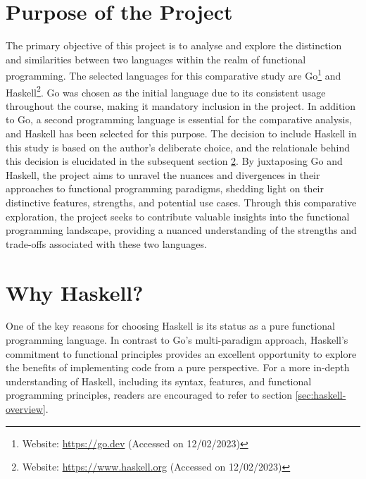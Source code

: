     \section{Purpose of the Project}\label{sec:purpose}
    The primary objective of this project is to analyse and explore the distinction and similarities between two languages within the realm of functional programming. The selected languages for this comparative study are Go\footnote{Website: \url{https://go.dev} (Accessed on 12/02/2023)} and Haskell\footnote{Website: \url{https://www.haskell.org} (Accessed on 12/02/2023)}. Go was chosen as the initial language due to its consistent usage throughout the course, making it mandatory inclusion in the project. 
    In addition to Go, a second programming language is essential for the comparative analysis, and Haskell has been selected for this purpose. The decision to include Haskell in this study is based on the author's deliberate choice, and the relationale behind this decision is elucidated in the subsequent section \ref{sec:whyhaskell}. By juxtaposing Go and Haskell, the project aims to unravel the nuances and divergences in their approaches to functional programming paradigms, shedding light on their distinctive features, strengths, and potential use cases. Through this comparative exploration, the project seeks to contribute valuable insights into the functional programming landscape, providing a nuanced understanding of the strengths and trade-offs associated with these two languages.

    \section{Why Haskell?}\label{sec:whyhaskell}
    One of the key reasons for choosing Haskell is its status as a pure functional programming language. In contrast to Go's multi-paradigm approach, Haskell's commitment to functional principles provides an excellent opportunity to explore the benefits of implementing code from a pure perspective.
    For a more in-depth understanding of Haskell, including its syntax, features, and functional programming principles, readers are encouraged to refer to section \ref{sec:haskell-overview}.

